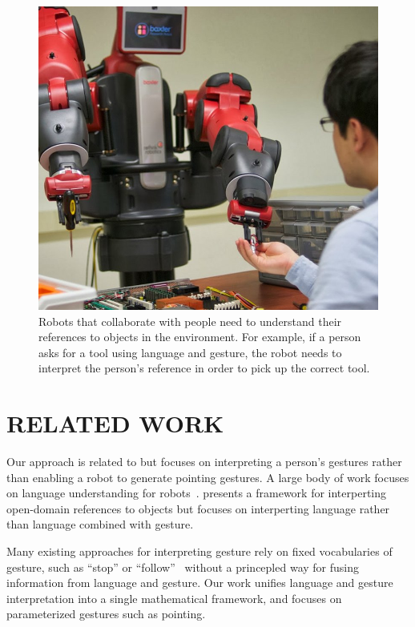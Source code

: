 \documentclass[letterpaper, 10 pt, conference]{ieeeconf}
\begin{document}
\begin{figure}
\centering
\includegraphics[width=1\linewidth]{figures/baxter_scene_cropped.jpg}
\caption{Robots that collaborate with people need to understand their
  references to objects in the environment.  For example, if a person
  asks for a tool using language and gesture, the robot needs to
  interpret the person's reference in order to pick up the correct
  tool.\label{fig:example}}
\end{figure}

\section{RELATED WORK}

Our approach is related to \citet{holladay14} but focuses on
interpreting a person's gestures rather than enabling a robot to
generate pointing gestures.  A large body of work focuses on language
understanding for robots~\citep{macmahon06, dzifcak09, kollar10,
  matuszek12}.  \citet{guadarrama14} presents a framework for
interperting open-domain references to objects but focuses on
interperting language rather than language combined with gesture.

Many existing approaches for interpreting gesture rely on fixed
vocabularies of gesture, such as ``stop'' or
``follow''~\citep{waldherr00, marge11} without a princepled way for
fusing information from language and gesture.  Our work unifies
language and gesture interpretation into a single mathematical
framework, and focuses on parameterized gestures such as pointing.
\end{document}
